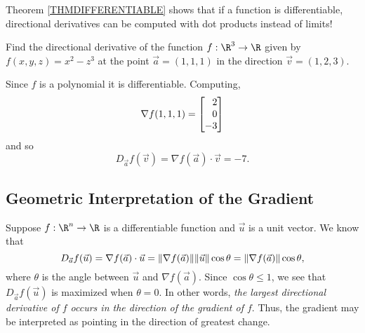 Theorem \ref{THMDIFFERENTIABLE} shows that if a function is differentiable,
directional derivatives can be computed with dot products instead of limits!

\begin{example}
	Find the directional derivative of the function $f:\R^3\to\R$
	given by $f(x,y,z)=x^2-z^3$ at the point $\vec a=(1,1,1)$ in the direction
	$\vec v=(1,2,3)$.

	Since $f$ is a polynomial it is differentiable.  Computing,
	\[
		\nabla f(1,1,1) = \mat{2\\0\\-3}
	\]
	and so
	\[
		D_{\vec a}f(\vec v) = \nabla f(\vec a)\cdot \vec v=-7.
	\]
\end{example}

\subsection{Geometric Interpretation of the Gradient}

Suppose $f:\R^n\to \R$ is a differentiable function and $\vec u$ is
a unit vector.  We know that
\[
	D_{\vec a}f(\vec u) = \nabla f(\vec a)\cdot \vec u = 
	\lVert\nabla f(\vec a)\rVert\lVert\vec u\rVert\cos\theta=\lVert\nabla f(\vec a)\rVert\cos\theta,
\]
where $\theta$ is the angle between $\vec u$ and $\nabla f(\vec a)$.
Since $\cos \theta \leq 1$,
we see that $D_{\vec a}f(\vec u)$ is maximized when $\theta=0$.  In other words,
\emph{the largest directional derivative 
of $f$ occurs in the direction of the gradient of $f$}.  Thus, the gradient may be interpreted
as pointing in the direction of greatest change.

\begin{center}
\end{center}

